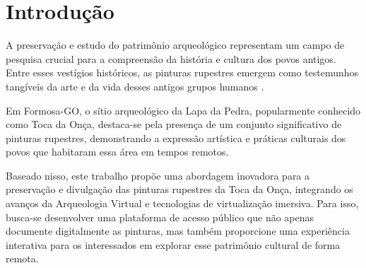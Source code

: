\chapter{Introdução}\label{Introducao}

A preservação e estudo do patrimônio arqueológico representam um campo de pesquisa crucial para a compreensão da história e cultura dos povos antigos. Entre esses vestígios históricos, as pinturas rupestres emergem como testemunhos tangíveis da arte e da vida desses antigos grupos humanos \citep{guimaraes2013}.



Em Formosa-GO, o sítio arqueológico da Lapa da Pedra, popularmente conhecido como Toca da Onça, destaca-se pela presença de um conjunto significativo de pinturas rupestres, demonstrando a expressão artística e práticas culturais dos povos que habitaram essa área em tempos remotos.
    
Baseado nisso, este trabalho propõe uma abordagem inovadora para a preservação e divulgação das pinturas rupestres da Toca da Onça, integrando os avanços da Arqueologia Virtual e tecnologias de virtualização imersiva. Para isso, busca-se desenvolver uma plataforma de acesso público que não apenas documente digitalmente as pinturas, mas também proporcione uma experiência interativa para os interessados em explorar esse patrimônio cultural de forma remota.

